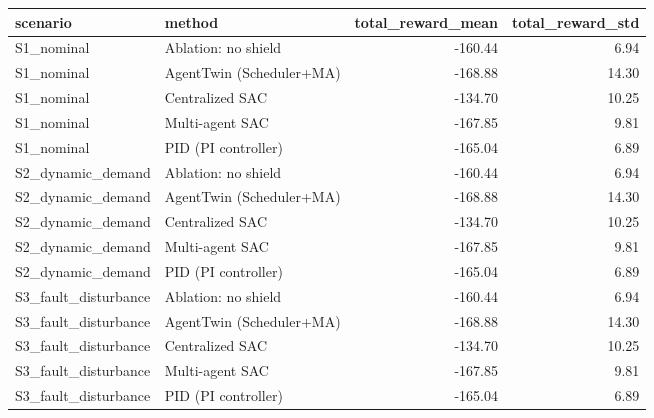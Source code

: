 \begin{tabular}{llrr}
\toprule
scenario & method & total_reward_mean & total_reward_std \\
\midrule
S1_nominal & Ablation: no shield & -160.44 & 6.94 \\
S1_nominal & AgentTwin (Scheduler+MA) & -168.88 & 14.30 \\
S1_nominal & Centralized SAC & -134.70 & 10.25 \\
S1_nominal & Multi-agent SAC & -167.85 & 9.81 \\
S1_nominal & PID (PI controller) & -165.04 & 6.89 \\
S2_dynamic_demand & Ablation: no shield & -160.44 & 6.94 \\
S2_dynamic_demand & AgentTwin (Scheduler+MA) & -168.88 & 14.30 \\
S2_dynamic_demand & Centralized SAC & -134.70 & 10.25 \\
S2_dynamic_demand & Multi-agent SAC & -167.85 & 9.81 \\
S2_dynamic_demand & PID (PI controller) & -165.04 & 6.89 \\
S3_fault_disturbance & Ablation: no shield & -160.44 & 6.94 \\
S3_fault_disturbance & AgentTwin (Scheduler+MA) & -168.88 & 14.30 \\
S3_fault_disturbance & Centralized SAC & -134.70 & 10.25 \\
S3_fault_disturbance & Multi-agent SAC & -167.85 & 9.81 \\
S3_fault_disturbance & PID (PI controller) & -165.04 & 6.89 \\
\bottomrule
\end{tabular}
